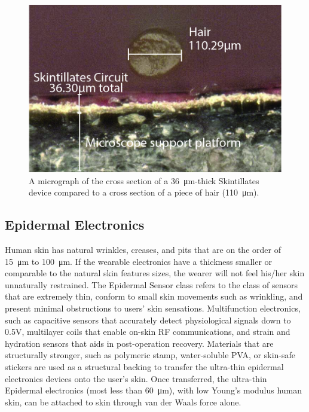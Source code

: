 \documentclass{sigchi}
\begin{document}
\begin{figure}[!h]
\centering
\includegraphics[width=1\columnwidth]{figures/Figure2}
\caption{A micrograph of the cross section of a \SI{36}{\micro\metre}-thick Skintillates device compared to a cross section of a piece of %
hair (\SI{110}{\micro\metre}).}
\vspace{-8pt}
\label{fig:figure2}
\end{figure}

\subsection{Epidermal Electronics}
Human skin has natural wrinkles, creases, and pits that are on the order of \SI{15}{\micro\metre} to \SI{100}{\micro\metre}. If the wearable electronics have a thickness smaller or comparable to the natural skin features sizes, the wearer will not feel his/her skin unnaturally restrained. The Epidermal Sensor class refers to the class of sensors that are extremely thin, conform to small skin movements such as wrinkling, and present minimal obstructions to users’ skin sensations. %
Multifunction electronics, such as capacitive sensors that accurately detect physiological signals down to 0.5V, multilayer coils that enable on-skin RF communications, and strain and hydration sensors that aids in post-operation recovery. %
Materials that are structurally stronger, such as polymeric stamp, water-soluble PVA, or skin-safe stickers are used as a structural backing to transfer the ultra-thin epidermal electronics devices onto the user's skin. Once transferred, the ultra-thin Epidermal electronics (most less than \SI{60}{\micro\metre}), with low Young's modulus %
 human skin, can be attached to skin through van der Waals force alone. 
\end{document}
